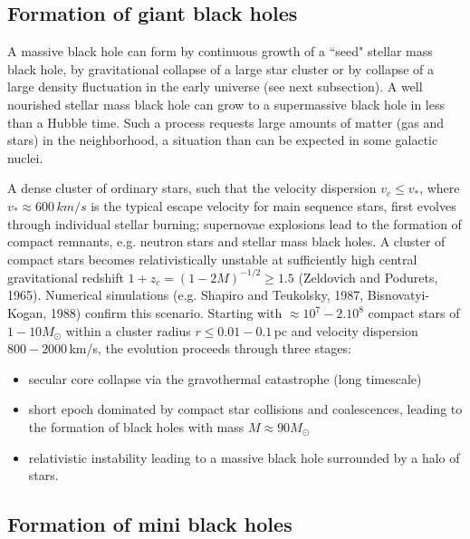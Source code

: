 \documentclass[12pt]{article}
\begin{document}
%
\subsection {Formation of giant black holes}

A massive black hole can form by continuous growth of a ``seed" stellar mass black
hole, by gravitational collapse of a large star cluster or by collapse 
of a large density
fluctuation in the early universe (see next subsection).
A well nourished stellar mass black hole can grow to a
supermassive black hole in less than a Hubble time. Such a process requests large
amounts of matter (gas and stars) in the neighborhood, a situation
than can be expected in some galactic nuclei.

A dense cluster of ordinary stars, such that the velocity dispersion $v_c \leq
v_*$, where $v_* \approx 600 \, km/s$ is the typical escape velocity for main sequence
stars, first evolves through individual stellar burning;
supernovae explosions lead to the formation of compact remnants, e.g. neutron stars
and stellar mass black holes. A cluster of compact stars becomes relativistically unstable at
sufficiently high central gravitational redshift $1+z_c = (1-2M)^{-1/2} \geq 1.5$
(Zeldovich and Podurets, 1965). Numerical simulations (e.g. Shapiro and Teukolsky, 1987,
Bisnovatyi-Kogan, 1988) confirm this scenario. Starting with $\approx 10^7 - 2.10^8$ compact
stars of $1-10 M_{\odot}$ within a cluster radius $r \leq 0.01 - 0.1 \,$pc and velocity
dispersion $800-2000 \, $km/s, the evolution proceeds through three stages: 
\begin{itemize}
\item secular core collapse via the gravothermal catastrophe (long timescale)
\item short epoch dominated by compact star collisions and coalescences, leading to the
formation of black holes with mass $M \approx 90 M_{\odot}$
\item relativistic instability leading to a massive black hole surrounded by a halo of
stars.
\end{itemize}    
%
\subsection {Formation of mini black holes}
\end{document}
